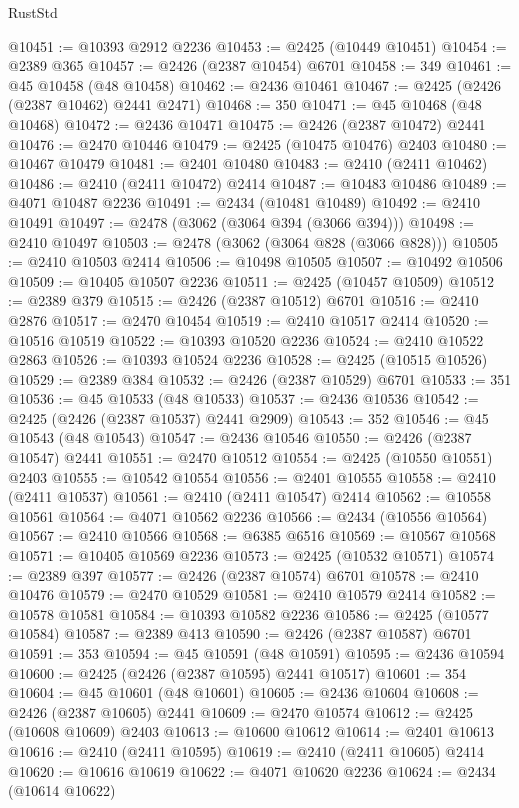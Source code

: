 \begin{lexlean}{RustStd}
\begin{coremodule}
@10451 := @10393 @2912 @2236
@10453 := @2425 (@10449 @10451)
@10454 := @2389 @365
@10457 := @2426 (@2387 @10454) @6701
@10458 := 349
@10461 := @45 @10458 (@48 @10458)
@10462 := @2436 @10461
@10467 := @2425 (@2426 (@2387 @10462) @2441 @2471)
@10468 := 350
@10471 := @45 @10468 (@48 @10468)
@10472 := @2436 @10471
@10475 := @2426 (@2387 @10472) @2441
@10476 := @2470 @10446
@10479 := @2425 (@10475 @10476) @2403
@10480 := @10467 @10479
@10481 := @2401 @10480
@10483 := @2410 (@2411 @10462)
@10486 := @2410 (@2411 @10472) @2414
@10487 := @10483 @10486
@10489 := @4071 @10487 @2236
@10491 := @2434 (@10481 @10489)
@10492 := @2410 @10491
@10497 := @2478 (@3062 (@3064 @394 (@3066 @394)))
@10498 := @2410 @10497
@10503 := @2478 (@3062 (@3064 @828 (@3066 @828)))
@10505 := @2410 @10503 @2414
@10506 := @10498 @10505
@10507 := @10492 @10506
@10509 := @10405 @10507 @2236
@10511 := @2425 (@10457 @10509)
@10512 := @2389 @379
@10515 := @2426 (@2387 @10512) @6701
@10516 := @2410 @2876
@10517 := @2470 @10454
@10519 := @2410 @10517 @2414
@10520 := @10516 @10519
@10522 := @10393 @10520 @2236
@10524 := @2410 @10522 @2863
@10526 := @10393 @10524 @2236
@10528 := @2425 (@10515 @10526)
@10529 := @2389 @384
@10532 := @2426 (@2387 @10529) @6701
@10533 := 351
@10536 := @45 @10533 (@48 @10533)
@10537 := @2436 @10536
@10542 := @2425 (@2426 (@2387 @10537) @2441 @2909)
@10543 := 352
@10546 := @45 @10543 (@48 @10543)
@10547 := @2436 @10546
@10550 := @2426 (@2387 @10547) @2441
@10551 := @2470 @10512
@10554 := @2425 (@10550 @10551) @2403
@10555 := @10542 @10554
@10556 := @2401 @10555
@10558 := @2410 (@2411 @10537)
@10561 := @2410 (@2411 @10547) @2414
@10562 := @10558 @10561
@10564 := @4071 @10562 @2236
@10566 := @2434 (@10556 @10564)
@10567 := @2410 @10566
@10568 := @6385 @6516
@10569 := @10567 @10568
@10571 := @10405 @10569 @2236
@10573 := @2425 (@10532 @10571)
@10574 := @2389 @397
@10577 := @2426 (@2387 @10574) @6701
@10578 := @2410 @10476
@10579 := @2470 @10529
@10581 := @2410 @10579 @2414
@10582 := @10578 @10581
@10584 := @10393 @10582 @2236
@10586 := @2425 (@10577 @10584)
@10587 := @2389 @413
@10590 := @2426 (@2387 @10587) @6701
@10591 := 353
@10594 := @45 @10591 (@48 @10591)
@10595 := @2436 @10594
@10600 := @2425 (@2426 (@2387 @10595) @2441 @10517)
@10601 := 354
@10604 := @45 @10601 (@48 @10601)
@10605 := @2436 @10604
@10608 := @2426 (@2387 @10605) @2441
@10609 := @2470 @10574
@10612 := @2425 (@10608 @10609) @2403
@10613 := @10600 @10612
@10614 := @2401 @10613
@10616 := @2410 (@2411 @10595)
@10619 := @2410 (@2411 @10605) @2414
@10620 := @10616 @10619
@10622 := @4071 @10620 @2236
@10624 := @2434 (@10614 @10622)

\end{coremodule}
\end{lexlean}
